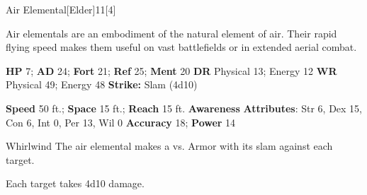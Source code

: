   \begin{monsection}{Air Elemental}[Elder]{11}[4]
    \vspace{-1em}\vspace{-1em}
    \vspace{0em}

    
    Air elementals are an embodiment of the natural element of air.
    Their rapid flying speed makes them useful on vast battlefields or in extended aerial combat.
  

    \begin{spellcontent}
      \begin{spelltargetinginfo}
        \pari \textbf{HP} 7;
          \textbf{AD} 24;
          \textbf{Fort} 21;
          \textbf{Ref} 25;
          \textbf{Ment} 20
        \pari \textbf{DR} Physical 13; Energy 12
        \pari \textbf{WR} Physical 49; Energy 48
        \pari \textbf{Strike:}
            Slam  (4d10)
      \end{spelltargetinginfo}
    \end{spellcontent}
    \begin{monsterfooter}
      \pari \textbf{Speed} 50 ft.;
        \textbf{Space} 15 ft.;
        \textbf{Reach} 15 ft.
      \pari \textbf{Awareness} 
      \pari \textbf{Attributes}:
        Str 6, Dex 15,
        Con 6, Int 0,
        Per 13, Wil 0
      \pari \textbf{Accuracy} 18;
        \textbf{Power} 14
    \end{monsterfooter}
  \end{monsection}
  \begin{freeability}{Whirlwind}
      The air elemental makes a 
         vs. Armor
        with its slam against each target.
    
    \hit Each target takes 4d10  damage.
    \end{freeability}
  
